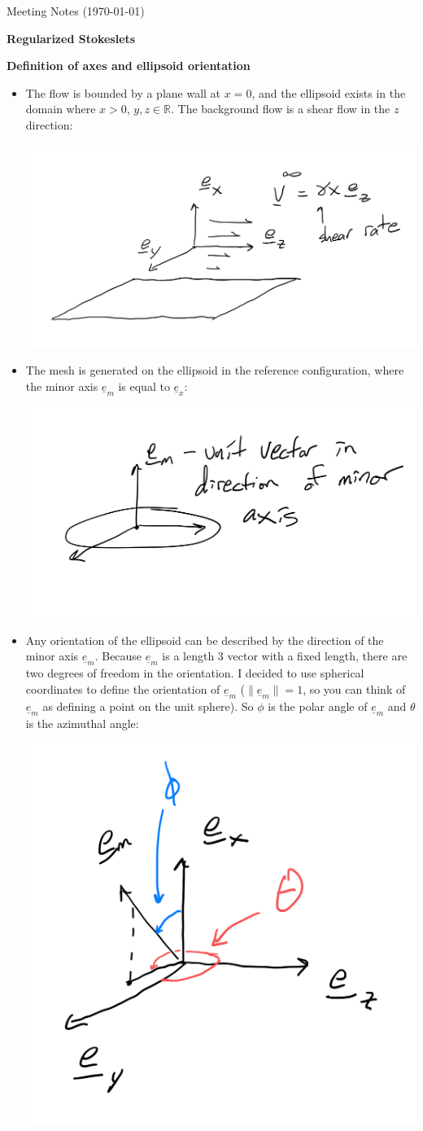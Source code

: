 \documentclass{article}
\def\R{\mathbb{R}}
\begin{document}
\pagestyle{plain}

\begin{center}
  {\Large Meeting Notes (\today)}
\end{center}

\large{\textbf{Regularized Stokeslets}}

\textbf{Definition of axes and ellipsoid orientation}
\begin{itemize}
\item The flow is bounded by a plane wall at $x = 0$, and the
  ellipsoid exists in the domain where $x > 0$, $y, z \in \R$. The
  background flow is a shear flow in the $z$ direction:
  \begin{center}
    \includegraphics[width=.5\textwidth]{axes}
  \end{center}
\item The mesh is generated on the ellipsoid in the reference
  configuration, where the minor axis $\underline{e}_m$ is equal to
  $\underline{e}_x$:
  \begin{center}
    \includegraphics[width=.3\textwidth]{reference}
  \end{center}
\item Any orientation of the ellipsoid can be described by the
  direction of the minor axis $\underline{e}_m$. Because
  $\underline{e}_m$ is a length 3 vector with a fixed length, there
  are two degrees of freedom in the orientation. I decided to use
  spherical coordinates to define the orientation of $\underline{e}_m$
  ($\|\underline{e}_m\| = 1$, so you can think of $\underline{e}_m$ as
  defining a point on the unit sphere). So $\phi$ is the polar angle
  of $\underline{e}_m$ and $\theta$ is the azimuthal angle:
  \begin{center}
    \includegraphics[width=.4\textwidth]{orientation}

\end{center}
\end{itemize}
\end{document}
